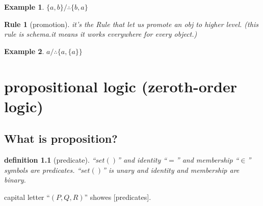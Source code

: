 \documentclass[10pt,a4paper]{book}
\newtheorem{definition}{definition}[section]
\newtheorem{example}{Example}[section]
\newtheorem{Rule}{Rule}[section]
\begin{document}
\begin{example}
    $\{a,b\} /\therefore \{b,a\}$
\end{example}





\begin{Rule}[promotion] it's the Rule that let us promote an obj to higher level.
    (this rule is schema.it means it works everywhere for every object.)
\end{Rule}



\begin{example}
    $a /\therefore \{ a , \{ a \} \}$
\end{example}

\chapter{propositional logic (zeroth-order logic)}

\section{What is proposition?}

\begin{definition}[predicate]  ``$set()$'' and identity ``$=$'' and membership ``$\in$'' symbols are predicates.
    ``$set()$'' is unary and identity and membership  are binary.
\end{definition}

capital letter ``$(P,Q,R)$'' showes [predicates].
\end{document}
